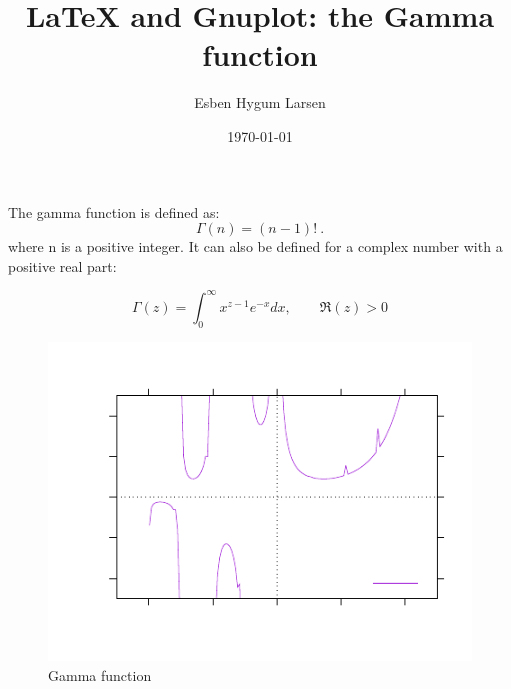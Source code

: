 \documentclass{article}
\title{\LaTeX{} and Gnuplot: the Gamma function}
\author{Esben Hygum Larsen}
\date{\today}
\begin{document}
\maketitle
The gamma function is defined as:
\begin{equation}
    \Gamma (n)=(n-1)!\ .
\end{equation}
\noindent where n is a positive integer. It can also be defined for a complex number with a positive real part:

\begin{equation}
    \Gamma (z)=\int _{0}^{\infty }x^{z-1}e^{-x} dx, \qquad \Re (z)>0
\end{equation}


\begin{figure}
    \centering
    \includegraphics[width = 0.95\columnwidth]{plot-gamma-eps-converted-to.pdf}
    \caption{Gamma function}
\end{figure}
\end{document}

